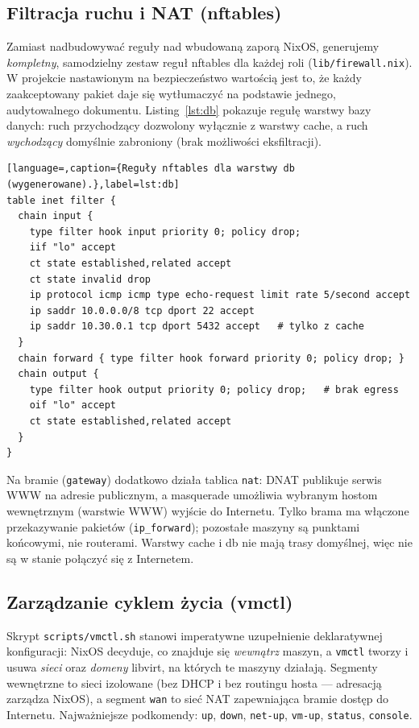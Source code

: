 \documentclass[11pt,a4paper]{article}
\begin{document}
\subsection{Filtracja ruchu i NAT (nftables)}
Zamiast nadbudowywać reguły nad wbudowaną zaporą NixOS, generujemy
\emph{kompletny}, samodzielny zestaw reguł nftables dla każdej roli
(\texttt{lib/firewall.nix}). W projekcie nastawionym na bezpieczeństwo wartością
jest to, że każdy zaakceptowany pakiet daje się wytłumaczyć na podstawie jednego,
audytowalnego dokumentu. Listing~\ref{lst:db} pokazuje regułę warstwy bazy
danych: ruch przychodzący dozwolony wyłącznie z warstwy cache, a ruch
\emph{wychodzący} domyślnie zabroniony (brak możliwości eksfiltracji).

\begin{lstlisting}[language=,caption={Reguły nftables dla warstwy db (wygenerowane).},label=lst:db]
table inet filter {
  chain input {
    type filter hook input priority 0; policy drop;
    iif "lo" accept
    ct state established,related accept
    ct state invalid drop
    ip protocol icmp icmp type echo-request limit rate 5/second accept
    ip saddr 10.0.0.0/8 tcp dport 22 accept
    ip saddr 10.30.0.1 tcp dport 5432 accept   # tylko z cache
  }
  chain forward { type filter hook forward priority 0; policy drop; }
  chain output {
    type filter hook output priority 0; policy drop;   # brak egress
    oif "lo" accept
    ct state established,related accept
  }
}
\end{lstlisting}

Na bramie (\texttt{gateway}) dodatkowo działa tablica \texttt{nat}: DNAT
publikuje serwis WWW na adresie publicznym, a masquerade umożliwia wybranym
hostom wewnętrznym (warstwie WWW) wyjście do Internetu. Tylko brama ma włączone
przekazywanie pakietów (\texttt{ip\_forward}); pozostałe maszyny są punktami
końcowymi, nie routerami. Warstwy cache i db nie mają trasy domyślnej, więc nie
są w stanie połączyć się z Internetem.

\subsection{Zarządzanie cyklem życia (vmctl)}
Skrypt \texttt{scripts/vmctl.sh} stanowi imperatywne uzupełnienie deklaratywnej
konfiguracji: NixOS decyduje, co znajduje się \emph{wewnątrz} maszyn, a
\texttt{vmctl} tworzy i usuwa \emph{sieci} oraz \emph{domeny} libvirt, na których
te maszyny działają. Segmenty wewnętrzne to sieci izolowane (bez DHCP i bez
routingu hosta --- adresacją zarządza NixOS), a segment \texttt{wan} to sieć NAT
zapewniająca bramie dostęp do Internetu. Najważniejsze podkomendy:
\texttt{up}, \texttt{down}, \texttt{net-up}, \texttt{vm-up}, \texttt{status},
\texttt{console}.
\end{document}
